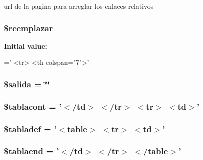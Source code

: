 url de la pagina para arreglar los enlaces relativos \hypertarget{accion_8php_a9b815abe13bb31dff998216079806408}{
\subsubsection[{\$reemplazar}]{\setlength{\rightskip}{0pt plus 5cm}\$reemplazar}}\label{accion_8php_a9b815abe13bb31dff998216079806408}
{\bfseries Initial value\-:}
\begin{DoxyCode}
=\textcolor{stringliteral}{'     <tr>}
\textcolor{stringliteral}{        <th colspan="7">'}
\end{DoxyCode}
\hypertarget{accion_8php_a91c96428692c3699abfeb14c571ae76a}{
\subsubsection[{\$salida}]{\setlength{\rightskip}{0pt plus 5cm}\$salida = \char`\"{}\char`\"{}}}\label{accion_8php_a91c96428692c3699abfeb14c571ae76a}
\hypertarget{accion_8php_ad04ea8dc18e6abf09f240b6911e3a7ca}{
\subsubsection[{\$tablacont}]{\setlength{\rightskip}{0pt plus 5cm}\$tablacont = '$<$/td$>$ $<$/tr$>$ $<$tr$>$ $<$td$>$'}}\label{accion_8php_ad04ea8dc18e6abf09f240b6911e3a7ca}
\hypertarget{accion_8php_aae64521d5d68e0fcfc9ffcef5576546f}{
\subsubsection[{\$tabladef}]{\setlength{\rightskip}{0pt plus 5cm}\$tabladef = '$<$table$>$ $<$tr$>$ $<$td$>$'}}\label{accion_8php_aae64521d5d68e0fcfc9ffcef5576546f}
\hypertarget{accion_8php_ac9b5ce205693e7912d458dc68f541603}{
\subsubsection[{\$tablaend}]{\setlength{\rightskip}{0pt plus 5cm}\$tablaend = '$<$/td$>$ $<$/tr$>$ $<$/table$>$'}}\label{accion_8php_ac9b5ce205693e7912d458dc68f541603}
